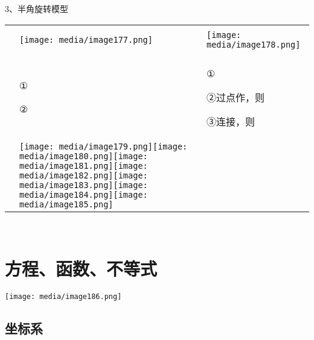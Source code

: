 \documentclass[a4paper,11pt,UTF8]{ctexart}
\begin{document}
3、半角旋转模型

\begin{longtable}[]{@{}lll@{}}
\toprule
\endhead
& &\tabularnewline
& \texttt{[image: media/image177.png]}
&
\texttt{[image: media/image178.png]}\tabularnewline
& &\tabularnewline
\begin{minipage}[t]{0.30\columnwidth}\raggedright
\strut
\end{minipage} & \begin{minipage}[t]{0.30\columnwidth}\raggedright
①

②\strut
\end{minipage} & \begin{minipage}[t]{0.30\columnwidth}\raggedright
①

②过点作，则

③连接，则\strut
\end{minipage}\tabularnewline
&
\texttt{[image: media/image179.png]}\texttt{[image: media/image180.png]}\texttt{[image: media/image181.png]}\texttt{[image: media/image182.png]}\texttt{[image: media/image183.png]}\texttt{[image: media/image184.png]}\texttt{[image: media/image185.png]}
&\tabularnewline
\bottomrule
\end{longtable}

~

\hypertarget{ux65b9ux7a0bux51fdux6570ux4e0dux7b49ux5f0f}{%
\section{\texorpdfstring{
方程、函数、不等式}{ 方程、函数、不等式}}\label{ux65b9ux7a0bux51fdux6570ux4e0dux7b49ux5f0f}}

\texttt{[image: media/image186.png]}

\hypertarget{ux5750ux6807ux7cfb}{%
\subsection{\texorpdfstring{
坐标系}{ 坐标系}}\label{ux5750ux6807ux7cfb}}
\end{document}
